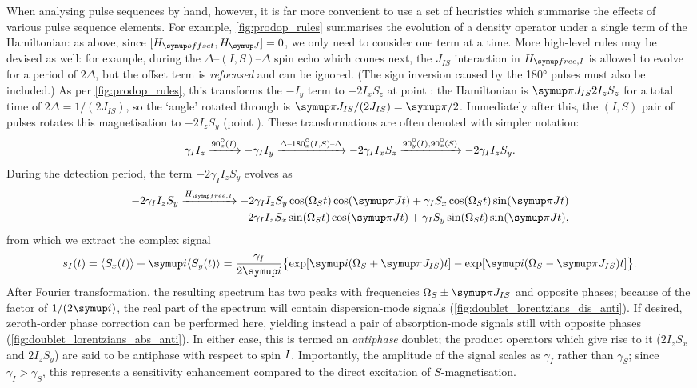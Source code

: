 When analysing pulse sequences by hand, however, it is far more convenient to use a set of heuristics which summarise the effects of various pulse sequence elements.
For example, \cref{fig:prodop_rules} summarises the evolution of a density operator under a single term of the Hamiltonian: as above, since $[\Hoffset, \HJ] = 0$, we only need to consider one term at a time.
More high-level rules may be devised as well: for example, during the $\Delta$--$(I,S)$--$\Delta$ spin echo which comes next, the $J_{IS}$ interaction in $\HfreeI$ is allowed to evolve for a period of $2\Delta$, but the offset term is \textit{refocused} and can be ignored.
(The sign inversion caused by the \ang{180} pulses must also be included.)
As per \cref{fig:prodop_rules}, this transforms the $-I_y$ term to $-2I_xS_z$ at point : the Hamiltonian is $\cpi J_{IS} 2I_zS_z$ for a total time of $2\Delta = 1/(2J_{IS})$, so the `angle' rotated through is $\cpi J_{IS}/(2J_{IS}) = \cpi/2$.
Immediately after this, the $(I,S)$ pair of pulses rotates this magnetisation to $-2I_zS_y$ (point ).
These transformations are often denoted with simpler notation:
\begin{equation}
    \label{eq:inept_prodop}
    \gamma_I I_z
    \xrightarrow{\angang{90}{x}(I)} -\gamma_I I_y
    \xrightarrow{\Delta\text{--}\angang{180}{x}(I,S)\text{--}\Delta} -2\gamma_I I_xS_z
    \xrightarrow{\angang{90}{y}(I),\angang{90}{x}(S)} -2\gamma_I I_zS_y.
\end{equation}
During the detection period, the term $-2\gamma_II_zS_y$ evolves as
\begin{align}
    \label{eq:inept_fid_prodop}
    -2\gamma_I I_zS_y \xrightarrow{\HfreeI} -2\gamma_I I_zS_y\cos(\Omega_St)\cos(\cpi Jt) + \gamma_I S_x\cos(\Omega_St)\sin(\cpi Jt) \notag{} \\
    \qquad \qquad {} - 2\gamma_I I_zS_x\sin(\Omega_St)\cos(\cpi Jt) + \gamma_I S_y\sin(\Omega_S t)\sin(\cpi Jt),
\end{align}
from which we extract the complex signal
\begin{equation}
    \label{eq:inept_fid}
    s_I(t) = \langle S_x(t) \rangle + \mi \langle S_y(t) \rangle = \frac{\gamma_I}{2\mi}\bigl\{\exp[\mi(\Omega_S + \cpi J_{IS})t] - \exp[\mi(\Omega_S - \cpi J_{IS})t]\bigr\}.
\end{equation}
After Fourier transformation, the resulting spectrum has two peaks with frequencies $\Omega_S \pm \cpi J_{IS}$ and opposite phases; because of the factor of $1/(2\mi)$, the real part of the spectrum will contain dispersion-mode signals (\cref{fig:doublet_lorentzians_dis_anti}).
If desired, zeroth-order phase correction can be performed here, yielding instead a pair of absorption-mode signals still with opposite phases (\cref{fig:doublet_lorentzians_abs_anti}).
In either case, this is termed an \textit{antiphase} doublet; the product operators which give rise to it ($2I_zS_x$ and $2I_zS_y$) are said to be antiphase with respect to spin $I\/$.
Importantly, the amplitude of the signal scales as $\gamma_I$ rather than $\gamma_S$; since $\gamma_I > \gamma_S$, this represents a sensitivity enhancement compared to the direct excitation of $S$-magnetisation.

